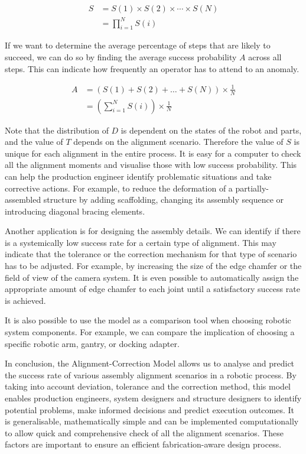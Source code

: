 \begin{align} \label{eq:total_probability_success}
    S &= S(1) \times S(2) \times \cdots \times S(N)\nonumber \\
      &= \prod_{i=1}^{N} S(i)
\end{align}

If we want to determine the average percentage of steps that are likely to succeed, we can do so by finding the average success probability $A$ across all steps. This can indicate how frequently an operator has to attend to an anomaly.

\begin{align} \label{eq:average_step_success_probability}
    A &= (S(1) + S(2) + \ldots + S(N)) \times \frac{1}{N}\nonumber \\
      &= \left(\sum_{i=1}^{N} S(i)\right) \times \frac{1}{N}
\end{align}

Note that the distribution of $D$ is dependent on the states of the robot and parts, and the value of $T$ depends on the alignment scenario. Therefore the value of $S$ is unique for each alignment in the entire process. It is easy for a computer to check all the alignment moments and visualise those with low success probability. This can help the production engineer identify problematic situations and take corrective actions. For example, to reduce the deformation of a partially-assembled structure by adding scaffolding, changing its assembly sequence or introducing diagonal bracing elements.

Another application is for designing the assembly details. We can identify if there is a systemically low success rate for a certain type of alignment. This may indicate that the tolerance or the correction mechanism for that type of scenario has to be adjusted. For example, by increasing the size of the edge chamfer or the field of view of the camera system. It is even possible to automatically assign the appropriate amount of edge chamfer to each joint until a satisfactory success rate is achieved.

It is also possible to use the model as a comparison tool when choosing robotic system components. For example, we can compare the implication of choosing a specific robotic arm, gantry, or docking adapter. 

In conclusion, the Alignment-Correction Model allows us to analyse and predict the success rate of various assembly alignment scenarios in a robotic process. By taking into account deviation, tolerance and the correction method, this model enables production engineers, system designers and structure designers to identify potential problems, make informed decisions and predict execution outcomes. It is generalisable, mathematically simple and can be implemented computationally to allow quick and comprehensive check of all the alignment scenarios. These factors are important to ensure an efficient fabrication-aware design process.


